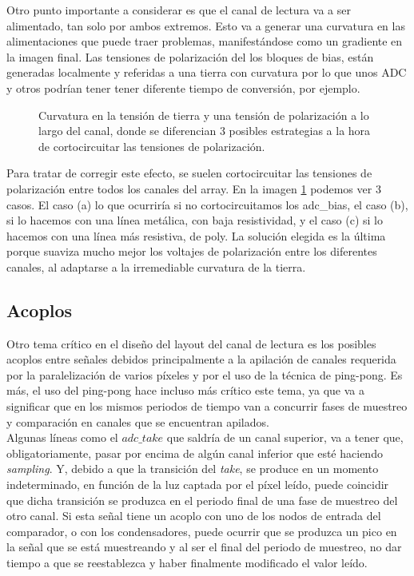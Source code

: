 Otro punto importante a considerar es que el canal de lectura va a ser alimentado,
tan solo por ambos extremos. Esto va a generar una curvatura en las alimentaciones
que puede traer problemas, manifestándose como un gradiente en la imagen final.
Las tensiones de polarización del los bloques de bias, están generadas localmente
y referidas a una tierra con curvatura por lo que unos ADC y otros
podrían tener tener diferente tiempo de conversión, por ejemplo.\\

\begin{figure}[ht]
	
	\caption[Consecuencias de la curvatura en la alimentación del canal]
	{Curvatura en la tensión de tierra y una tensión de polarización a lo largo del canal,
	donde se diferencian 3 posibles estrategias a la hora de cortocircuitar las
	tensiones de polarización.}
	\label{fig:adc_poly_short}
\end{figure}

Para tratar de corregir este efecto, se suelen cortocircuitar las tensiones de polarización
entre todos los canales del array. En la imagen \ref{fig:adc_poly_short} podemos ver
3 casos. El caso (a) lo que ocurriría si no cortocircuitamos los adc\_bias,
el caso (b), si lo hacemos con una línea metálica, con baja resistividad,
y el caso (c) si lo hacemos con una línea más resistiva, de poly.
La solución elegida es la última porque suaviza mucho mejor los voltajes de polarización
entre los diferentes canales, al adaptarse a la irremediable curvatura de la tierra.\\

\subsection{Acoplos}

Otro tema crítico en el diseño del layout del canal de lectura es los posibles acoplos
entre señales debidos principalmente a la apilación de canales requerida por la
paralelización de varios píxeles y por el uso de la técnica de ping-pong. Es más,
el uso del ping-pong hace incluso más crítico este tema, ya que va a significar
que en los mismos periodos de tiempo van a concurrir fases de muestreo y comparación
en canales que se encuentran apilados.\\

Algunas líneas como el $adc\_take$ que saldría de un canal superior, va a tener que,
obligatoriamente, pasar por encima de algún canal inferior que esté haciendo
\textit{sampling}. Y, debido a que la transición del \textit{take}, se produce
en un momento indeterminado, en función de la luz captada por el píxel leído, puede
coincidir que dicha transición se produzca en el periodo final de una fase de
muestreo del otro canal. Si esta señal tiene un acoplo con uno de los nodos de
entrada del comparador, o con los condensadores, puede ocurrir que se produzca
un pico en la señal que se está muestreando y al ser el final del periodo de muestreo,
no dar tiempo a que se reestablezca y haber finalmente modificado el valor leído.\\

